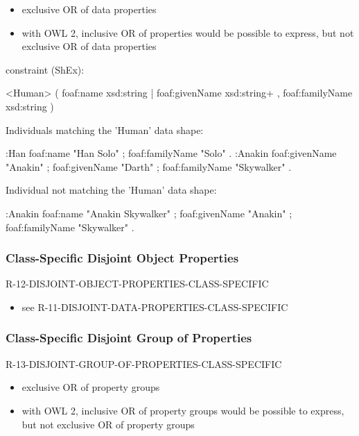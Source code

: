 \documentclass{llncs}
\begin{document}
\begin{itemize}
	\item exclusive OR of data properties
	\item with OWL 2, inclusive OR of properties would be possible to express, but not exclusive OR of data properties
\end{itemize}

constraint (ShEx):

\begin{ex}
<Human> { (  
    foaf:name xsd:string | foaf:givenName xsd:string+ , 
    foaf:familyName xsd:string ) }
\end{ex}

Individuals matching the 'Human' data shape:

\begin{ex}
:Han
    foaf:name "Han Solo" ;
    foaf:familyName "Solo" .
:Anakin
    foaf:givenName "Anakin" ;
    foaf:givenName "Darth" ;
    foaf:familyName "Skywalker" .
\end{ex}

Individual not matching the 'Human' data shape:

\begin{ex}
:Anakin
    foaf:name "Anakin Skywalker" ;
    foaf:givenName "Anakin" ;
    foaf:familyName "Skywalker" .
\end{ex}

\subsubsection{Class-Specific Disjoint Object Properties}

R-12-DISJOINT-OBJECT-PROPERTIES-CLASS-SPECIFIC

\begin{itemize}
	\item see R-11-DISJOINT-DATA-PROPERTIES-CLASS-SPECIFIC
\end{itemize}

\subsubsection{Class-Specific Disjoint Group of Properties}

R-13-DISJOINT-GROUP-OF-PROPERTIES-CLASS-SPECIFIC

\begin{itemize}
	\item exclusive OR of property groups
	\item with OWL 2, inclusive OR of property groups would be possible to express, but not exclusive OR of property groups
\end{itemize}
\end{document}
